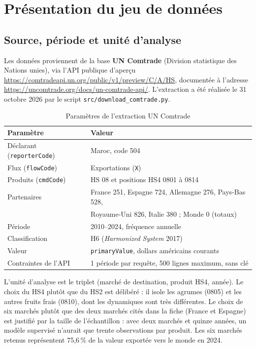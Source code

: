 \documentclass[11pt,a4paper]{article}
\begin{document}
\section{Présentation du jeu de données}\label{sec:data}

\subsection{Source, période et unité d'analyse}

Les données proviennent de la base \textbf{UN Comtrade} (Division statistique des
Nations unies), via l'API publique d'aperçu
\url{https://comtradeapi.un.org/public/v1/preview/C/A/HS}, documentée à l'adresse
\url{https://uncomtrade.org/docs/un-comtrade-api/}. L'extraction a été réalisée
le 31 octobre 2026 par le script \texttt{src/download\_comtrade.py}.

\begin{table}[H]
\centering
\caption{Paramètres de l'extraction UN Comtrade}\label{tab:extraction}
\begin{tabular}{ll}
\toprule
Paramètre & Valeur \\
\midrule
Déclarant (\texttt{reporterCode}) & Maroc, code 504 \\
Flux (\texttt{flowCode}) & Exportations (\texttt{X}) \\
Produits (\texttt{cmdCode}) & HS 08 et positions HS4 0801 à 0814 \\
Partenaires & France 251, Espagne 724, Allemagne 276, Pays-Bas 528, \\
             & Royaume-Uni 826, Italie 380 ; Monde 0 (totaux) \\
Période & 2010--2024, fréquence annuelle \\
Classification & H6 (\emph{Harmonized System} 2017) \\
Valeur & \texttt{primaryValue}, dollars américains courants \\
Contraintes de l'API & 1 période par requête, 500 lignes maximum, sans clé \\
\bottomrule
\end{tabular}
\end{table}

L'unité d'analyse est le triplet (marché de destination, produit HS4, année).
Le choix du HS4 plutôt que du HS2 est délibéré : il isole les agrumes (0805) et
les autres fruits frais (0810), dont les dynamiques sont très différentes.
Le choix de six marchés plutôt que des deux marchés cités dans la fiche
(France et Espagne) est justifié par la taille de l'échantillon : avec deux
marchés et quinze années, un modèle supervisé n'aurait que trente observations
par produit. Les six marchés retenus représentent 75,6\,\% de la valeur exportée
vers le monde en 2024.
\end{document}
